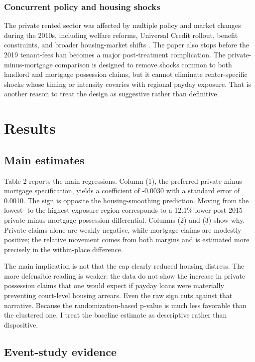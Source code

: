 \documentclass[12pt]{article}
\begin{document}
\subsubsection*{Concurrent policy and housing shocks}
The private rented sector was affected by multiple policy and market changes during the 2010s, including welfare reforms, Universal Credit rollout, benefit constraints, and broader housing-market shifts \citep{fitzpatrick2016, gibbons2021}. The paper also stops before the 2019 tenant-fees ban becomes a major post-treatment complication. The private-minus-mortgage comparison is designed to remove shocks common to both landlord and mortgage possession claims, but it cannot eliminate renter-specific shocks whose timing or intensity covaries with regional payday exposure. That is another reason to treat the design as suggestive rather than definitive.

\section{Results}

\subsection{Main estimates}



Table 2 reports the main regressions. Column (1), the preferred private-minus-mortgage specification, yields a coefficient of -0.0030 with a standard error of 0.0010. The sign is opposite the housing-smoothing prediction. Moving from the lowest- to the highest-exposure region corresponds to a 12.1\% lower post-2015 private-minus-mortgage possession differential. Columns (2) and (3) show why. Private claims alone are weakly negative, while mortgage claims are modestly positive; the relative movement comes from both margins and is estimated more precisely in the within-place difference.

The main implication is not that the cap clearly reduced housing distress. The more defensible reading is weaker: the data do not show the increase in private possession claims that one would expect if payday loans were materially preventing court-level housing arrears. Even the raw sign cuts against that narrative. Because the randomization-based p-value is much less favorable than the clustered one, I treat the baseline estimate as descriptive rather than dispositive.

\subsection{Event-study evidence}
\end{document}
